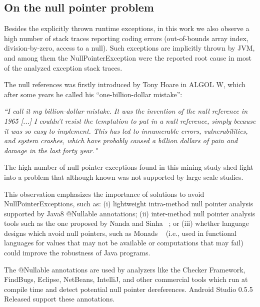 \documentclass[conference]{IEEEtran}
\begin{document}
\subsection{On the null pointer problem}

Besides the explicitly thrown runtime exceptions, in this work we also observe a high number of 
stack traces reporting coding errors (out-of-bounds array index, division-by-zero, access to a null).
Such exceptions are implicitly thrown by JVM, and among them the NullPointerException 
were the reported root cause in most of the analyzed exception stack traces.

The null references was firstly introduced by Tony Hoare in ALGOL W, which after some years he called his “one-billion-dollar mistake”:

\emph{``I call it my billion-dollar mistake. It was the invention of the null reference in 1965 [...] I couldn’t resist the temptation to put 
in a null reference, simply because it was so easy to implement. This has led to innumerable errors, vulnerabilities, and system 
crashes, which have probably caused a billion dollars of pain and damage in the last forty year."}

The high number of null pointer exceptions found in this mining study shed light into a problem
that although known was not supported by large scale studies. 

This observation emphasizes the importance of solutions to avoid NullPointerExceptions, such as:
(i) lightweight intra-method null pointer analysis supported by Java8 @Nullable annotations;
(ii) inter-method null pointer analysis tools such as the one proposed by Nanda and Sinha ~\cite{nanda2009accurate};
or (iii) whether language designs which avoid null pointers, such 
as Monads ~\cite{Walde95} (i.e., used in functional languages for values that may not be available 
or computations that may fail) could improve the robustness of Java programs. 

The @Nullable annotations are used by analyzers like the Checker Framework, FindBugs, Eclipse, 
NetBeans, IntelliJ, and other commercial tools which run at compile time and detect potential null 
pointer dereferences. Android Studio 0.5.5 Released support these annotations.

\end{document}
